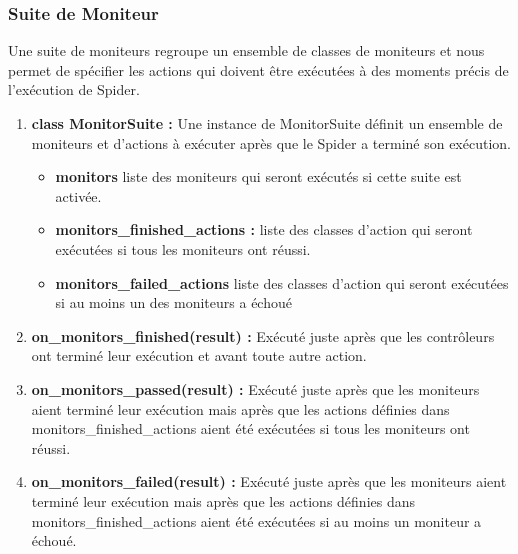 \subsubsection{Suite de Moniteur}
Une suite de moniteurs regroupe un ensemble de classes de moniteurs et nous permet de spécifier les actions qui doivent être exécutées à des moments précis de l'exécution de Spider.
\begin{enumerate}
    \item\textbf{class MonitorSuite :} Une instance de MonitorSuite définit un ensemble de moniteurs et d'actions à exécuter après que le Spider a terminé son exécution.
    \begin{itemize}
        \item \textbf{monitors} liste des moniteurs qui seront exécutés si cette suite est activée.
        \item \textbf{monitors\_finished\_actions :} liste des classes d'action qui seront exécutées si tous les moniteurs ont réussi.
        \item \textbf{monitors\_failed\_actions} liste des classes d'action qui seront exécutées si au moins un des moniteurs a échoué
    \end{itemize}
    \item \textbf{on\_monitors\_finished(result) :} Exécuté juste après que les contrôleurs ont terminé leur exécution et avant toute autre action.
    \item \textbf{on\_monitors\_passed(result) :} Exécuté juste après que les moniteurs aient terminé leur exécution mais après que les actions définies dans monitors\_finished\_actions aient été exécutées si tous les moniteurs ont réussi.
    \item \textbf{on\_monitors\_failed(result) :} Exécuté juste après que les moniteurs aient terminé leur exécution mais après que les actions définies dans monitors\_finished\_actions aient été exécutées si au moins un moniteur a échoué.

\end{enumerate}

